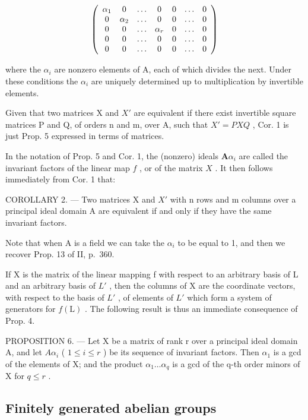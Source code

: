 \[
\left( \begin{array}{c c c c c c c} \alpha_ {1} & 0 & \ldots & 0 & 0 & \ldots & 0 \\ 0 & \alpha_ {2} & \ldots & 0 & 0 & \ldots & 0 \\ 0 & 0 & \ldots & \alpha_ {r} & 0 & \ldots & 0 \\ 0 & 0 & \ldots & 0 & 0 & \ldots & 0 \\ 0 & 0 & \ldots & 0 & 0 & \ldots & 0 \end{array} \right)
\]

where the \(\alpha_{i}\) are nonzero elements of A, each of which divides the next. Under these conditions the \(\alpha_{i}\) are uniquely determined up to multiplication by invertible elements.

Given that two matrices X and \(X'\) are equivalent if there exist invertible square matrices P and Q, of orders n and m, over A, such that \(X' = PXQ\) , Cor. 1 is just Prop. 5 expressed in terms of matrices.

In the notation of Prop. 5 and Cor. 1, the (nonzero) ideals \(\mathbf{A}\alpha_{i}\) are called the invariant factors of the linear map \(f\) , or of the matrix \(X\) . It then follows immediately from Cor. 1 that:

COROLLARY 2. --- Two matrices X and \(X'\) with n rows and m columns over a principal ideal domain A are equivalent if and only if they have the same invariant factors.

Note that when A is a field we can take the \(\alpha_{i}\) to be equal to 1, and then we recover Prop. 13 of II, p.~360.

If X is the matrix of the linear mapping f with respect to an arbitrary basis of L and an arbitrary basis of \(L'\) , then the columns of X are the coordinate vectors, with respect to the basis of \(L'\) , of elements of \(L'\) which form a system of generators for \(f(\mathrm{L})\) . The following result is thus an immediate consequence of Prop. 4.

PROPOSITION 6. --- Let X be a matrix of rank r over a principal ideal domain A, and let \(A\alpha_{i}\) ( \(1 \leqslant i \leqslant r\) ) be its sequence of invariant factors. Then \(\alpha_{1}\) is a gcd of the elements of X; and the product \(\alpha_{1} \ldots \alpha_{q}\) is a gcd of the q-th order minors of X for \(q \leqslant r\) .

\subsection{Finitely generated abelian groups}

